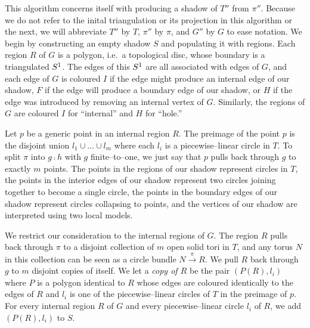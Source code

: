 \label{alg:constreg}

This algorithm concerns itself with producing a shadow of $T''$ from $\pi''$.
Because we do not refer to the inital triangulation or its projection in this algorithm or the next, we will abbreviate $T''$ by $T$, $\pi''$ by $\pi$, and $G''$ by $G$ to ease notation.
We begin by constructing an empty shadow $S$ and populating it with regions.
Each region $R$ of $G$ is a polygon, i.e.\ a topological disc, whose boundary is a triangulated $S^1$.
The edges of this $S^1$ are all associated with edges of $G$, and each edge of $G$ is coloured $I$ if the edge might produce an internal edge of our shadow, $F$ if the edge will produce a boundary edge of our shadow, or $H$ if the edge was introduced by removing an internal vertex of $G$.
Similarly, the regions of $G$ are coloured $I$ for ``internal'' and $H$ for ``hole.''

Let $p$ be a generic point in an internal region $R$.
The preimage of the point $p$ is the disjoint union $l_1\cup\dots\cup l_m$ where each $l_i$ is a piecewise--linear circle in $T$.
To split $\pi$ into $g\comp h$ with $g$ finite--to--one, we just say that $p$ pulls back through $g$ to exactly $m$ points.
The points in the regions of our shadow represent circles in $T$, the points in the interior edges of our shadow represent two circles joining together to become a single circle, the points in the boundary edges of our shadow represent circles collapsing to points, and the vertices of our shadow are interpreted using two local models.

We restrict our consideration to the internal regions of $G$.
The region $R$ pulls back through $\pi$ to a disjoint collection of $m$ open solid tori in $T$, and any torus $N$ in this collection can be seen as a circle bundle $N\overset{\pi}{\to} R$.
We pull $R$ back through $g$ to $m$ disjoint copies of itself.
We let a \emph{copy of $R$} be the pair $(P(R),l_i)$ where $P$ is a polygon identical to $R$ whose edges are coloured identically to the edges of $R$ and $l_i$ is one of the piecewise--linear circles of $T$ in the preimage of $p$.
For every internal region $R$ of $G$ and every piecewise--linear circle $l_i$ of $R$, we add $(P(R),l_i)$ to $S$.

